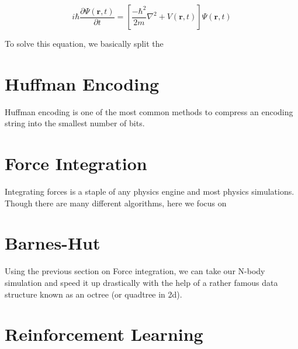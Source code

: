 \documentclass[11pt]{article}
\begin{document}
$$
i \hbar \frac{\partial \Psi(\mathbf{r}, t)}{\partial t} = \left[\frac{-\hbar^2}{2m} \nabla^2 + V(\mathbf{r},t) \right] \Psi(\mathbf{r},t)
$$

To solve this equation, we basically split the 

\newpage
\section*{Huffman Encoding}
Huffman encoding is one of the most common methods to compress an encoding string into the smallest number of bits. 

\newpage
\section*{Force Integration}
Integrating forces is a staple of any physics engine and most physics simulations. Though there are many different algorithms, here we focus on 

\newpage
\section*{Barnes-Hut}
Using the previous section on Force integration, we can take our N-body simulation and speed it up drastically with the help of a rather famous data structure known as an octree (or quadtree in 2d).

\section*{Reinforcement Learning}
\end{document}
